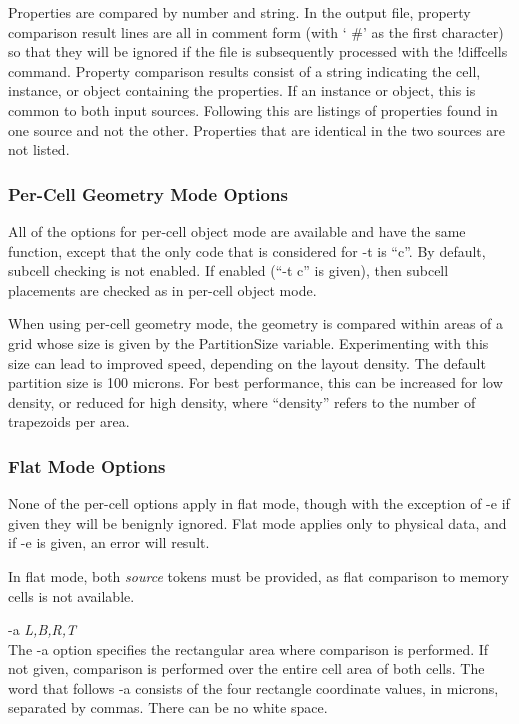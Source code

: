 Properties are compared by number and string.  In the output file,
property comparison result lines are all in comment form (with `{\vt
\#}' as the first character) so that they will be ignored if the file
is subsequently processed with the {\cb !diffcells} command.  Property
comparison results consist of a string indicating the cell, instance,
or object containing the properties.  If an instance or object, this
is common to both input sources.  Following this are listings of
properties found in one source and not the other.  Properties that are
identical in the two sources are not listed.

\subsubsection{Per-Cell Geometry Mode Options}

All of the options for per-cell object mode are available and have the
same function, except that the only code that is considered for {\vt
-t} is ``{\vt c}''.  By default, subcell checking is not enabled.  If
enabled (``{\vt -t c}'' is given), then subcell placements are checked
as in per-cell object mode.

When using per-cell geometry mode, the geometry is compared within
areas of a grid whose size is given by the {\et PartitionSize}
variable.  Experimenting with this size can lead to improved speed,
depending on the layout density.  The default partition size is 100
microns.  For best performance, this can be increased for low density,
or reduced for high density, where ``density'' refers to the number of
trapezoids per area.

\subsubsection{Flat Mode Options}

None of the per-cell options apply in flat mode, though with the
exception of {\vt -e} if given they will be benignly ignored.  Flat
mode applies only to physical data, and if {\vt -e} is given, an error
will result.

In flat mode, both {\it source} tokens must be provided, as flat
comparison to memory cells is not available.

\begin{description}
\item{{\vt -a} {\it L,B,R,T}}\\
The {\vt -a} option specifies the rectangular area where comparison is
performed.  If not given, comparison is performed over the entire cell
area of both cells.  The word that follows {\vt -a} consists of the
four rectangle coordinate values, in microns, separated by commas. 
There can be no white space.
\end{description}

